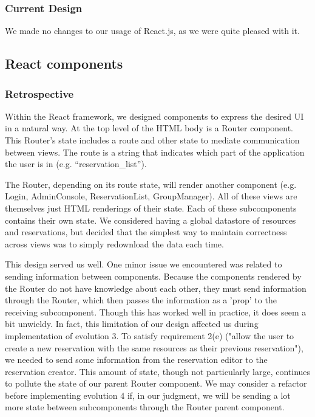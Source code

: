 \documentclass[12pt]{article}
\begin{document}
\subsubsection{Current Design}
We made no changes to our usage of React.js, as we were quite pleased with it.

\subsection{React components}
\subsubsection{Retrospective}
Within the React framework, we designed components to express the desired UI in a natural way. At the top level of the HTML body is a Router component. This Router's state includes a route and other state to mediate communication between views. The route is a string that indicates which part of the application the user is in (e.g. ``reservation\_list'').

The Router, depending on its route state, will render another component (e.g. Login, AdminConsole, ReservationList, GroupManager). All of these views are themselves just HTML renderings of their state. Each of these subcomponents contains their own state. We considered having a global datastore of resources and reservations, but decided that the simplest way to maintain correctness across views was to simply redownload the data each time.

This design served us well. One minor issue we encountered was related to sending information between components. Because the components rendered by the Router do not have knowledge about each other, they must send information through the Router, which then passes the information as a 'prop' to the receiving subcomponent. Though this has worked well in practice, it does seem a bit unwieldy. In fact, this limitation of our design affected us during implementation of evolution 3. To satisfy requirement 2(e) ("allow the user to create a new reservation with the same resources as their previous reservation"), we needed to send some information from the reservation editor to the reservation creator. This amount of state, though not particularly large, continues to pollute the state of our parent Router component. We may consider a refactor before implementing evolution 4 if, in our judgment, we will be sending a lot more state between subcomponents through the Router parent component.
\end{document}
